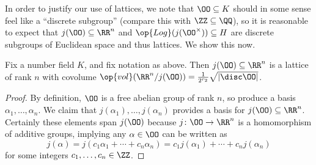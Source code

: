 \documentclass[../notes.tex]{subfiles}
\begin{document}
In order to justify our use of lattices, we note that $\OO\subseteq K$ should in some sense feel like a ``discrete subgroup'' (compare this with $\ZZ\subseteq\QQ$), so it is reasonable to expect that $j(\OO)\subseteq\RR^n$ and $\op{Log}(j(\OO^\times))\subseteq H$ are discrete subgroups of Euclidean space and thus lattices. We show this now.
\begin{proposition} \label{prop:order-lattice}
	Fix a number field $K$, and fix notation as above. Then $j(\OO)\subseteq\RR^n$ is a lattice of rank $n$ with covolume $\op{vol}(\RR^n/j(\OO))=\frac1{2^{r_2}}\sqrt{\left|\disc\OO\right|}$.
\end{proposition}
\begin{proof}
	By definition, $\OO$ is a free abelian group of rank $n$, so produce a basis $\alpha_1,\ldots,\alpha_n$. We claim that $j(\alpha_1),\ldots,j(\alpha_n)$ provides a basis for $j(\OO)\subseteq\RR^n$. Certainly these elements span $j(\OO)$ because $j\colon\OO\to\RR^n$ is a homomorphism of additive groups, implying any $\alpha\in\OO$ can be written as
	\[j(\alpha)=j(c_1\alpha_1+\cdots+c_n\alpha_n)=c_1j(\alpha_1)+\cdots+c_nj(\alpha_n)\]
	for some integers $c_1,\ldots,c_n\in\ZZ$. 
	

\end{proof}
\end{document}
